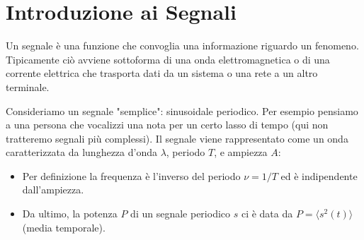 \documentclass[openany,a4paper,12pt]{book}
\begin{document}
\cleardoublepage
\tableofcontents
\cleardoublepage

\chapter{Introduzione ai Segnali}

Un segnale è una funzione che convoglia una informazione riguardo un fenomeno. Tipicamente ciò avviene sottoforma di una onda elettromagnetica o di una corrente elettrica che trasporta dati da un sistema o una rete a un altro terminale.

Consideriamo un segnale "semplice": sinusoidale periodico. Per esempio pensiamo a una persona che vocalizzi una nota per un certo lasso di tempo (qui non tratteremo segnali più complessi). Il segnale viene rappresentato come un onda caratterizzata da lunghezza d'onda $\lambda$, periodo $T$, e ampiezza $A$:

\begin{figure}[H]
    \centering
\end{figure}

\begin{itemize}[label=\textcolor{PoliBlue}{\textbullet}]
    \item Per definizione la frequenza è l'inverso del periodo $\nu = 1 / T$ ed è indipendente dall'ampiezza.
    \item Da ultimo, la potenza $P$ di un segnale periodico $s$ ci è data da $P = \langle s^2(t) \rangle$ (media temporale).
\end{itemize}
\end{document}
